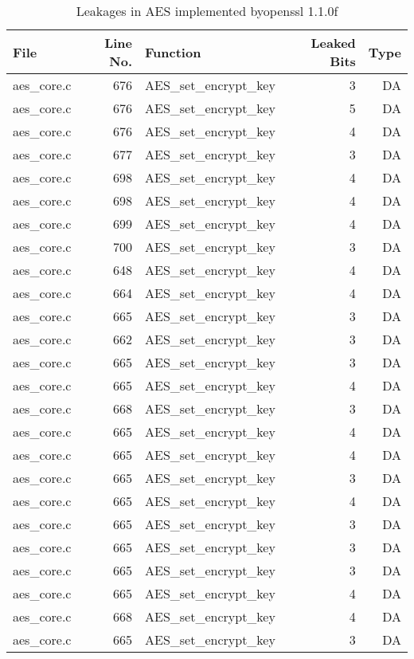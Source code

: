 \begin{table}%
\centering\tiny\scriptsize
\renewcommand{\baselinestretch}{0.96}\selectfont
\caption{Leakages in AES implemented byopenssl 1.1.0f}\label{tab:AESopenssl1.1.0f}
\begin{tabular}{lrlrr}
\hline
\textbf{File} & \textbf{Line No.} & \textbf{Function} & \textbf{Leaked Bits} & \textbf{Type} \\\hline
aes\_core.c& 676&AES\_set\_encrypt\_key&3 &DA\\
aes\_core.c& 676&AES\_set\_encrypt\_key&5 &DA\\
aes\_core.c& 676&AES\_set\_encrypt\_key&4 &DA\\
aes\_core.c& 677&AES\_set\_encrypt\_key&3 &DA\\
aes\_core.c& 698&AES\_set\_encrypt\_key&4 &DA\\
aes\_core.c& 698&AES\_set\_encrypt\_key&4 &DA\\
aes\_core.c& 699&AES\_set\_encrypt\_key&4 &DA\\
aes\_core.c& 700&AES\_set\_encrypt\_key&3 &DA\\
aes\_core.c& 648&AES\_set\_encrypt\_key&4 &DA\\
aes\_core.c& 664&AES\_set\_encrypt\_key&4 &DA\\
aes\_core.c& 665&AES\_set\_encrypt\_key&3 &DA\\
aes\_core.c& 662&AES\_set\_encrypt\_key&3 &DA\\
aes\_core.c& 665&AES\_set\_encrypt\_key&3 &DA\\
aes\_core.c& 665&AES\_set\_encrypt\_key&4 &DA\\
aes\_core.c& 668&AES\_set\_encrypt\_key&3 &DA\\
aes\_core.c& 665&AES\_set\_encrypt\_key&4 &DA\\
aes\_core.c& 665&AES\_set\_encrypt\_key&4 &DA\\
aes\_core.c& 665&AES\_set\_encrypt\_key&3 &DA\\
aes\_core.c& 665&AES\_set\_encrypt\_key&4 &DA\\
aes\_core.c& 665&AES\_set\_encrypt\_key&3 &DA\\
aes\_core.c& 665&AES\_set\_encrypt\_key&3 &DA\\
aes\_core.c& 665&AES\_set\_encrypt\_key&3 &DA\\
aes\_core.c& 665&AES\_set\_encrypt\_key&4 &DA\\
aes\_core.c& 668&AES\_set\_encrypt\_key&4 &DA\\
aes\_core.c& 665&AES\_set\_encrypt\_key&3 &DA\\

\end{tabular}
\end{table}
